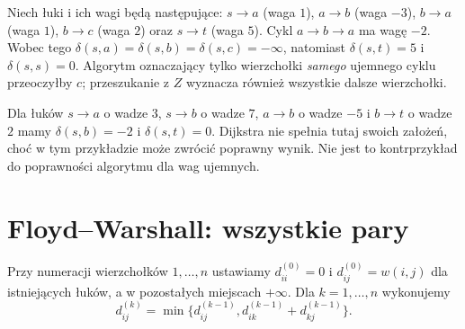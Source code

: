 \begin{przyklad}
\label{ex:tg-weighted-negative-propagation}
Niech łuki i ich wagi będą następujące:
$s\to a$ (waga $1$), $a\to b$ (waga $-3$),
$b\to a$ (waga $1$), $b\to c$ (waga $2$)
oraz $s\to t$ (waga $5$).
Cykl $a\to b\to a$ ma wagę $-2$.
Wobec tego
$\delta(s,a)=\delta(s,b)=\delta(s,c)=-\infty$,
natomiast $\delta(s,t)=5$
i $\delta(s,s)=0$.
Algorytm oznaczający tylko wierzchołki
\emph{samego} ujemnego cyklu przeoczyłby
$c$; przeszukanie z $Z$ wyznacza
również wszystkie dalsze wierzchołki.
\end{przyklad}

\begin{przyklad}
Dla łuków $s\to a$ o wadze $3$,
$s\to b$ o wadze $7$, $a\to b$
o wadze $-5$ i $b\to t$ o wadze $2$
mamy $\delta(s,b)=-2$ i $\delta(s,t)=0$.
Dijkstra nie spełnia tutaj swoich założeń, choć w tym
przykładzie może zwrócić poprawny wynik. Nie jest to
kontrprzykład do poprawności algorytmu dla wag ujemnych.
\end{przyklad}

\section{Floyd--Warshall: wszystkie pary}
\label{sec:tg-weighted-floyd}

Przy numeracji wierzchołków $1,\ldots,n$
ustawiamy $d^{(0)}_{ii}=0$ i
$d^{(0)}_{ij}=w(i,j)$ dla istniejących łuków,
a w pozostałych miejscach $+\infty$.
Dla $k=1,\ldots,n$ wykonujemy
\[
d^{(k)}_{ij}=
\min\{d^{(k-1)}_{ij},
d^{(k-1)}_{ik}+d^{(k-1)}_{kj}\}.
\]

